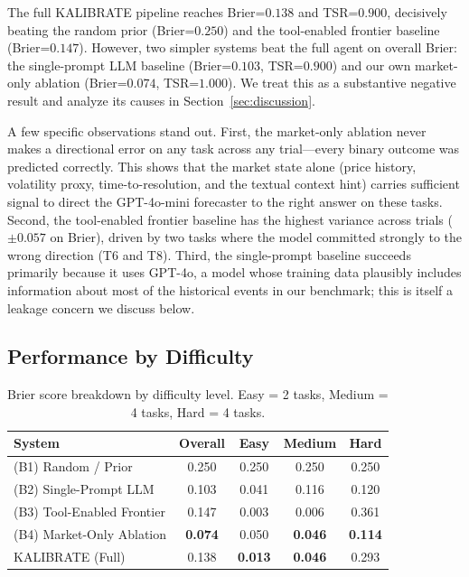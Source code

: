 \documentclass{article} %
\newcommand{\agentname}{KALIBRATE}
\begin{document}
The full \agentname{} pipeline reaches Brier=$0.138$ and TSR=$0.900$, decisively beating the random prior (Brier=$0.250$) and the tool-enabled frontier baseline (Brier=$0.147$). However, two simpler systems beat the full agent on overall Brier: the single-prompt LLM baseline (Brier=$0.103$, TSR=$0.900$) and our own market-only ablation (Brier=$0.074$, TSR=$1.000$). We treat this as a substantive negative result and analyze its causes in Section~\ref{sec:discussion}.

A few specific observations stand out. First, the market-only ablation never makes a directional error on any task across any trial---every binary outcome was predicted correctly. This shows that the market state alone (price history, volatility proxy, time-to-resolution, and the textual context hint) carries sufficient signal to direct the GPT-4o-mini forecaster to the right answer on these tasks. Second, the tool-enabled frontier baseline has the highest variance across trials ($\pm0.057$ on Brier), driven by two tasks where the model committed strongly to the wrong direction (T6 and T8). Third, the single-prompt baseline succeeds primarily because it uses GPT-4o, a model whose training data plausibly includes information about most of the historical events in our benchmark; this is itself a leakage concern we discuss below.

\subsection{Performance by Difficulty}

\begin{table}[t]
\centering
\caption{Brier score breakdown by difficulty level. Easy = 2 tasks, Medium = 4 tasks, Hard = 4 tasks.}
\label{tab:by_difficulty}
\begin{tabular}{lcccc}
\toprule
\textbf{System} & \textbf{Overall} & \textbf{Easy} & \textbf{Medium} & \textbf{Hard} \\
\midrule
(B1) Random / Prior         & 0.250 & 0.250 & 0.250 & 0.250 \\
(B2) Single-Prompt LLM      & 0.103 & 0.041 & 0.116 & 0.120 \\
(B3) Tool-Enabled Frontier  & 0.147 & 0.003 & 0.006 & 0.361 \\
(B4) Market-Only Ablation   & \textbf{0.074} & 0.050 & \textbf{0.046} & \textbf{0.114} \\
\agentname{} (Full)         & 0.138 & \textbf{0.013} & \textbf{0.046} & 0.293 \\
\bottomrule
\end{tabular}
\end{table}
\end{document}

